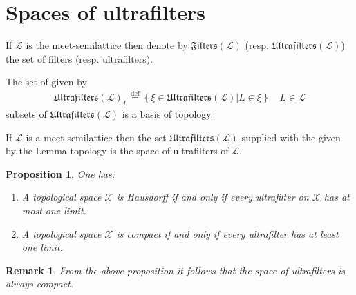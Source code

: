 \documentclass{beamer}
\theoremstyle{plain}
\newtheorem{rem}{Remark}
\newtheorem{prop}{Proposition}
\newcommand{\bean}{\begin{eqnarray*}}
\newcommand{\eean}{\end{eqnarray*}}
\newcommand{\sX}{\mathcal{X}}       %
\newcommand{\bydef}{\stackrel{\mathrm{def}}{=}}
\begin{document}
	\section{Spaces of ultrafilters}
\begin{frame}
\begin{definition}\label{lattice_s_defn}
	If $\mathscr L$ is  the meet-semilattice  then denote by   $\mathfrak{Filters}\left( \mathscr L\right)$  (resp.  $\mathfrak{Ultrafilters}\left( \mathscr L\right)$) the  set of filters  (resp. ultrafilters). \end{definition}
\begin{lemma}\label{topology_l_lem} 
	The set of given by 
	\bean\label{topology_l_eqn}
\mathfrak{Ultrafilters}\left( \mathscr L\right)_L \bydef \left\{ \left.\xi \in \mathfrak{Ultrafilters}\left( \mathscr L\right)\right| L \in \xi\right\}\quad L \in \mathscr L  
	\eean
subsets of $\mathfrak{Ultrafilters}\left( \mathscr L\right)$ 	is a basis of topology.
\end{lemma}
\begin{definition}\label{topology_l_defn} 
	If 	$\mathscr L$ is  a meet-semilattice then the set $\mathfrak{Ultrafilters}\left( \mathscr L\right)$  supplied with the given by the Lemma  topology is the \alert{space of ultrafilters} of $\mathscr L$.
\end{definition}

\end{frame}	
\begin{frame}
		\begin{prop}\label{top_ultra_prop}
	One has:
	\begin{enumerate}
		\item [(a)] 	A topological space $\sX$ is Hausdorff  if and only if every ultrafilter on $\sX$ has at most one limit.
		\item[(b)]   	A topological space $\sX$ is compact if and only if every ultrafilter has at least one limit.
	\end{enumerate} 
\end{prop}
\begin{rem}
From the above proposition it follows that the space of ultrafilters is always compact.
\end{rem}
\end{frame}
\end{document}
